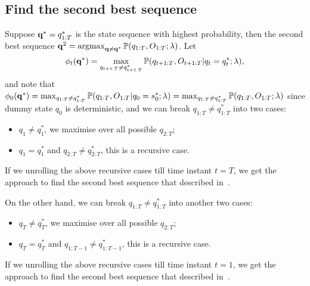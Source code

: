 \subsection{Find the second best sequence}
\label{ssec:2ndbest}

Suppose $\mathbf{q}^* = q_{1:T}^*$ is the state sequence with highest probability,
then the second best sequence $\mathbf{q}^2 = \operatorname*{argmax}_{\mathbf{q} \ne \mathbf{q}^*} \mathbb{P}(q_{1:T}, O_{1:T}; \lambda)$.
Let 
\begin{equation}
\phi_t(\mathbf{q}^*) = \max_{q_{t+1:T} \ne q_{t+1:T}^*} \mathbb{P}(q_{t+1:T}, O_{t+1:T} |q_t = q_t^*; \lambda),
\end{equation}
and note that 
$\phi_0(\mathbf{q}^*) = \max_{q_{1:T} \ne q_{1:T}^*} \mathbb{P}(q_{1:T}, O_{1:T} |q_0 = s_0^*; \lambda) = \max_{q_{1:T} \ne q_{1:T}^*} \mathbb{P}(q_{1:T}, O_{1:T}; \lambda)$
since dummy state $q_0$ is deterministic, and we can break $q_{1:T} \ne q_{1:T}^*$ into two cases:
\begin{itemize}
\item $q_1 \ne q_1^*$, we maximise over all possible $q_{2:T}$;
\item $q_1 = q_1^*$ and $q_{2:T} \ne q_{2:T}^*$, this is a recursive case.
\end{itemize}
If we unrolling the above recursive cases till time instant $t = T$, we get the approach to find the second best sequence 
that described in~\cite{nilsson2001sequentially}.

On the other hand, we can break $q_{1:T} \ne q_{1:T}^*$ into another two cases:
\begin{itemize}
\item $q_T \ne q_T^*$, we maximise over all possible $q_{2:T}$;
\item $q_T = q_T^*$ and $q_{1:T-1} \ne q_{1:T-1}^*$, this is a recursive case.
\end{itemize}
If we unrolling the above recursive cases till time instant $t = 1$, we get the approach to find the second best sequence 
that described in~\cite{seshadri1994list}.

